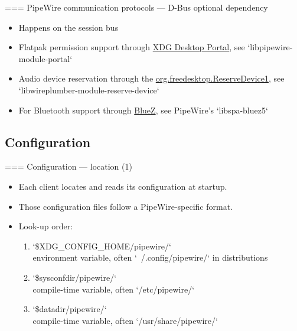=== {PipeWire communication protocols — D-Bus optional dependency}
  \begin{itemize}

  \item Happens on the session bus
  \item Flatpak permission support through
    \href{https://docs.flatpak.org/en/latest/desktop-integration.html\#portals}{
    XDG Desktop Portal}, see `libpipewire-module-portal`
  \item Audio device reservation through the
    \href{https://git.0pointer.net/reserve.git/tree/reserve.txt}{
    org.freedesktop.ReserveDevice1}, see
    `libwireplumber-module-reserve-device`
  \item For Bluetooth support through
    \href{https://www.bluez.org/}{BlueZ}, see PipeWire's
    `libspa-bluez5`

  \end{itemize}




\subsection{Configuration}



=== {Configuration — location (1)}
  \begin{itemize}

  \item Each client locates and reads its configuration at startup.

  \item Those configuration files follow a PipeWire-specific format.

  \item Look-up order:
    \begin{enumerate}
    \item `\$XDG_CONFIG_HOME/pipewire/`\\
      environment variable, often `~/.config/pipewire/` in distributions
    \item `\$sysconfdir/pipewire/`\\
      compile-time variable, often `/etc/pipewire/`
    \item `\$datadir/pipewire/`\\
      compile-time variable, often `/usr/share/pipewire/`
    \end{enumerate}

  \end{itemize}




